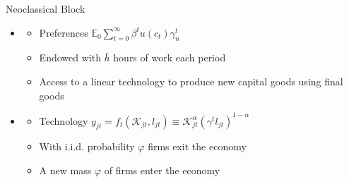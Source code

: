 \documentclass[english,xcolor=svgnames,aspectratio=169]{beamer}
\begin{document}
\begin{frame}{Neoclassical Block}

\begin{itemize}

    \item {\color{dblue}{\bf Households}} \medskip
    \begin{itemize}

    \item Preferences $\mathbb E_{0}\sum \limits_{t=0}^{\infty} \beta^{t} u(c_{t})\gamma^t_{n}$
 \medskip

    \item  Endowed with $\bar{h}$ hours of work each period \medskip

    \item Access to a linear technology to produce new capital goods using final goods

\end{itemize}

\bigskip

\item {\color{dblue}{\bf  Firms }} \medskip

\begin{itemize}
\item Technology $y_{jt}=f_{t}(\mathcal K_{jt}, l_{jt})\equiv\mathcal K_{jt}^\alpha (\gamma^t l_{jt})^{1-\alpha}$  \medskip

\item With i.i.d. probability $\varphi$ firms exit the economy  \medskip

\item A new mass $\varphi$ of firms enter the economy

\end{itemize}
\end{itemize}

\end{frame}
\end{document}
